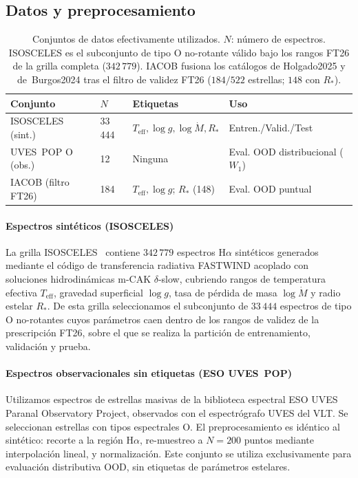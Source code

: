 \documentclass[sigconf,ACM]{acmart}
\begin{document}
\subsection{Datos y preprocesamiento}
\label{subsec:datos}

\begin{table}[ht]
  \caption{Conjuntos de datos efectivamente utilizados. $N$: número de
    espectros. ISOSCELES es el subconjunto de tipo O no-rotante válido bajo los
    rangos FT26 de la grilla completa ($342\,779$). IACOB fusiona los catálogos
    de Holgado2025 y de~Burgos2024 tras el filtro de validez FT26
    ($184/522$ estrellas; $148$ con $R_*$).}
  \label{tab:datasets}
  \small
  \setlength{\tabcolsep}{3pt}
  \begin{tabular}{@{}l l >{\raggedright\arraybackslash}p{2.3cm} >{\raggedright\arraybackslash}p{2.0cm}@{}}
    \toprule
    \textbf{Conjunto} & \textbf{$N$} & \textbf{Etiquetas} & \textbf{Uso} \\
    \midrule
    ISOSCELES (sint.) & 33\,444 & $T_{\mathrm{eff}}, \log g, \log \dot{M}, R_{*}$ & Entren./Valid./Test \\
    UVES~POP O (obs.) & 12 & Ninguna & Eval. OOD distribucional ($W_1$) \\
    IACOB (filtro FT26) & 184 & $T_{\mathrm{eff}}, \log g$; $R_*$ (148) & Eval. OOD puntual \\
    \bottomrule
  \end{tabular}
\end{table}

\paragraph{Espectros sintéticos (ISOSCELES)}
La grilla ISOSCELES~\cite{Ortiz2025} contiene $342\,779$ espectros H$\alpha$ sintéticos generados mediante el código de transferencia radiativa FASTWIND acoplado con soluciones hidrodinámicas m-CAK $\delta$-slow, cubriendo rangos de temperatura efectiva $T_{\mathrm{eff}}$, gravedad superficial $\log g$, tasa de pérdida de masa $\log \dot{M}$ y radio estelar $R_*$. De esta grilla seleccionamos el subconjunto de $33\,444$ espectros de tipo O no-rotantes cuyos parámetros caen dentro de los rangos de validez de la prescripción FT26, sobre el que se realiza la partición de entrenamiento, validación y prueba.%

\paragraph{Espectros observacionales sin etiquetas (ESO UVES~POP)}
Utilizamos espectros de estrellas masivas de la biblioteca espectral
ESO UVES Paranal Observatory Project, observados con el
espectrógrafo UVES del VLT. Se seleccionan
estrellas con tipos espectrales O. El preprocesamiento es
idéntico al sintético: recorte a la región H$\alpha$, re-muestreo a
$N = 200$ puntos mediante interpolación lineal, y normalización.
Este conjunto se utiliza exclusivamente para evaluación distributiva OOD, sin
etiquetas de parámetros estelares.
\end{document}
